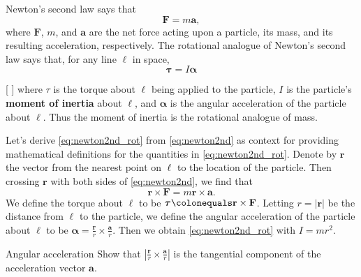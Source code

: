 \documentclass[prettycode,shellescape]{watsonbook}
\begin{document}
Newton's second law says that
\begin{equation} \label{eq:newton2nd} 
  \mathbf{F} = m \mathbf{a},
\end{equation}
where $\mathbf{F}$, $m$, and $\mathbf{a}$ are the net force acting
upon a particle, its mass, and its resulting acceleration,
respectively. The rotational analogue of Newton's second law says
that, for any line $\ell$ in space,
\begin{equation} \label{eq:newton2nd_rot} 
  \boldsymbol{\tau} = I \boldsymbol{\alpha}
\end{equation}
\begin{insetfigure}{\usebox{\asybox}}[ \label{fig:MOI}]
  where $\tau$ is the torque about $\ell$ being applied to the
  particle, $I$ is the particle's \textbf{moment of inertia} about
  $\ell$, and $\boldsymbol{\alpha}$ is the angular acceleration of the
  particle about $\ell$. Thus the moment of inertia is the rotational
  analogue of mass.
  
  Let's derive \eqref{eq:newton2nd_rot} from \eqref{eq:newton2nd} as
  context for providing mathematical definitions for the quantities in
  \eqref{eq:newton2nd_rot}. Denote by $\mathbf{r}$ the vector from the
  nearest point on $\ell$ to the location of the particle. Then
  crossing $\mathbf{r}$ with both sides of \eqref{eq:newton2nd}, we
  find that
  \[
    \mathbf{r} \times \mathbf{F} = m \mathbf{r} \times \mathbf{a}. 
  \]
  We define the torque about $\ell$ to be $\boldsymbol{\tau} \colonequals
  \mathbf{r} \times \mathbf{F}$. Letting $r = |\mathbf{r}|$ be the
  distance from $\ell$ to the particle, we define the angular
  acceleration of the particle about $\ell$ to be $\boldsymbol{\alpha} =
  \frac{\mathbf{r}}{r} \times \frac{\mathbf{a}}{r}$. Then we obtain
  \eqref{eq:newton2nd_rot} with $I = mr^2$.
\end{insetfigure}

\begin{exercise}{Angular acceleration}{}
  Show that $\left|\frac{\mathbf{r}}{r} \times
    \frac{\mathbf{a}}{r}\right|$ is the tangential component of
  the acceleration vector $\mathbf{a}$. 
\end{exercise}
\end{document}

